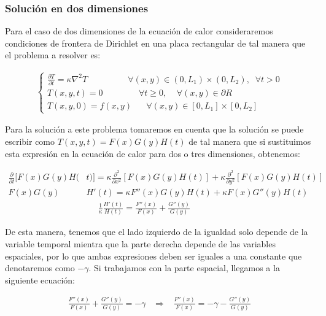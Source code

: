 \documentclass[12pt]{article}
\begin{document}
\subsubsection{Solución en dos dimensiones}

Para el caso de dos dimensiones de la ecuación de calor consideraremos condiciones de frontera de Dirichlet en una placa rectangular de tal manera que el problema a resolver es:

\begin{align}
    \begin{cases}
        \frac{\partial T}{\partial t} = \kappa \nabla^2T \;\;\;\;\;\;\;\;\;\;\;\;\;\;\;\;\; \forall (x,y)\in (0,L_1)\times(0,L_2), \;\; \forall t>0 \\
        T(x,y,t) = 0 \;\;\;\;\;\;\;\;\;\;\;\;\;\;\; \forall t \geq 0, \;\;\;\; \forall(x,y) \in \partial R \\
        T(x,y,0) = f(x,y) \;\;\;\;\;\; \forall (x,y)\in [0,L_1]\times[0,L_2]
    \end{cases}
\end{align}

Para la solución a este problema tomaremos en cuenta que la solución se puede escribir como $T(x,y,t) = F(x)G(y)H(t)$ de tal manera que si sustituimos esta expresión en la ecuación de calor para dos o tres dimensiones, obtenemos:

\begin{align*}
    \frac{\partial}{\partial t}[F(x)G(y)H(&t)] = \kappa\frac{\partial^2}{\partial x^2}[F(x)G(y)H(t)] + \kappa\frac{\partial^2}{\partial y^2}[F(x)G(y)H(t)] \\
    F(x)G(y)&H'(t) = \kappa F''(x)G(y)H(t) + \kappa F(x)G''(y)H(t) \\
    &\;\;\;\;\;\frac{1}{\kappa}\frac{H'(t)}{H(t)} = \frac{F''(x)}{F(x)} + \frac{G''(y)}{G(y)}
\end{align*}

De esta manera, tenemos que el lado izquierdo de la igualdad solo depende de la variable temporal mientra que la parte derecha depende de las variables espaciales, por lo que ambas expresiones deben ser iguales a una constante que denotaremos como $-\gamma$. Si trabajamos con la parte espacial, llegamos a la siguiente ecuación:

\begin{align*}
    \frac{F''(x)}{F(x)} + \frac{G''(y)}{G(y)} = -\gamma \;\;\; \Rightarrow \;\;\; \frac{F''(x)}{F(x)} = -\gamma - \frac{G''(y)}{G(y)}
\end{align*}
\end{document}
